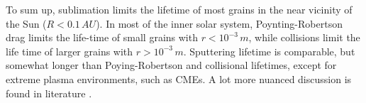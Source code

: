 To sum up, sublimation limits the lifetime of most grains in the near vicinity of the Sun ($R<0.1 \, \si{AU}$). In most of the inner solar system, Poynting-Robertson drag limits the life-time of small grains with $r<10^{-3} \, \si{m}$, while collisions limit the life time of larger grains with $r>10^{-3} \, \si{m}$. Sputtering lifetime is comparable, but somewhat longer than Poying-Robertson and collisional lifetimes, except for extreme plasma environments, such as CMEs. A lot more nuanced discussion is found in literature \citep{klepper2021influence,baumann2020dust,grun1985collisional,whipple1967maintaining,myrvang2018temperature}.  